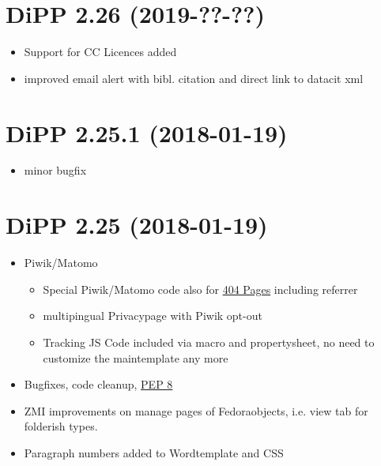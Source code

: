 \documentclass[a4paper,10pt,ngerman]{sphinxmanual}
\begin{document}
\section{DiPP 2.26 (2019-??-??)}
\label{changelog:dipp-2-26-2019}\begin{itemize}
\item {} 
Support for CC Licences added

\item {} 
improved email alert with bibl. citation and direct
link to datacit xml

\end{itemize}


\section{DiPP 2.25.1 (2018-01-19)}
\label{changelog:dipp-2-25-1-2018-01-19}\begin{itemize}
\item {} 
minor bugfix

\end{itemize}


\section{DiPP 2.25 (2018-01-19)}
\label{changelog:dipp-2-25-2018-01-19}\begin{itemize}
\item {} 
Piwik/Matomo
\begin{itemize}
\item {} 
Special Piwik/Matomo code also for \href{https://matomo.org/faq/how-to/faq\_60/}{404 Pages} including referrer

\item {} 
multipingual Privacypage with Piwik opt-out

\item {} 
Tracking JS Code included via macro and propertysheet, no need to
customize the maintemplate any more

\end{itemize}

\item {} 
Bugfixes, code cleanup, \href{https://www.python.org/dev/peps/pep-0008/}{PEP 8}

\item {} 
ZMI improvements on manage pages of Fedoraobjects, i.e. view tab
for folderish types.

\item {} 
Paragraph numbers added to Wordtemplate and CSS

\end{itemize}
\end{document}
